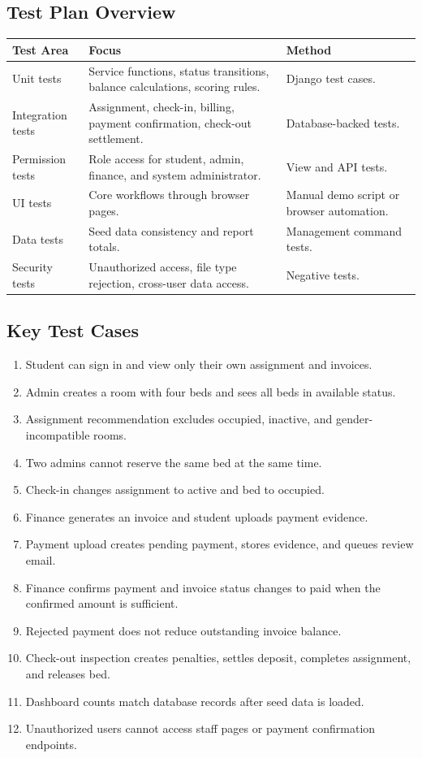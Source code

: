 \documentclass[11pt,a4paper]{article}
\begin{document}
\subsection{Test Plan Overview}

\begin{longtable}{L{0.20\textwidth} L{0.45\textwidth} L{0.22\textwidth}}
\toprule
\textbf{Test Area} & \textbf{Focus} & \textbf{Method}\\
\midrule
\endhead
Unit tests & Service functions, status transitions, balance calculations, scoring rules. & Django test cases.\\
Integration tests & Assignment, check-in, billing, payment confirmation, check-out settlement. & Database-backed tests.\\
Permission tests & Role access for student, admin, finance, and system administrator. & View and API tests.\\
UI tests & Core workflows through browser pages. & Manual demo script or browser automation.\\
Data tests & Seed data consistency and report totals. & Management command tests.\\
Security tests & Unauthorized access, file type rejection, cross-user data access. & Negative tests.\\
\bottomrule
\end{longtable}

\subsection{Key Test Cases}
\begin{enumerate}
  \item Student can sign in and view only their own assignment and invoices.
  \item Admin creates a room with four beds and sees all beds in available status.
  \item Assignment recommendation excludes occupied, inactive, and gender-incompatible rooms.
  \item Two admins cannot reserve the same bed at the same time.
  \item Check-in changes assignment to active and bed to occupied.
  \item Finance generates an invoice and student uploads payment evidence.
  \item Payment upload creates pending payment, stores evidence, and queues review email.
  \item Finance confirms payment and invoice status changes to paid when the confirmed amount is sufficient.
  \item Rejected payment does not reduce outstanding invoice balance.
  \item Check-out inspection creates penalties, settles deposit, completes assignment, and releases bed.
  \item Dashboard counts match database records after seed data is loaded.
  \item Unauthorized users cannot access staff pages or payment confirmation endpoints.
\end{enumerate}
\end{document}
